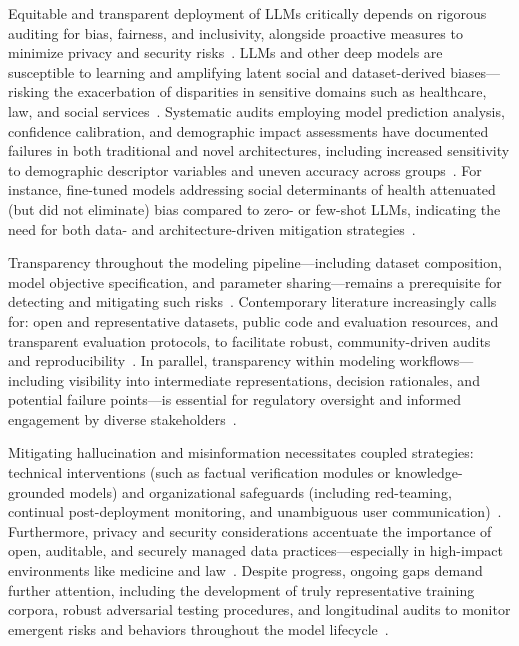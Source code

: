 \documentclass[sigconf]{acmart}
\begin{document}
Equitable and transparent deployment of LLMs critically depends on rigorous auditing for bias, fairness, and inclusivity, alongside proactive measures to minimize privacy and security risks~\cite{ref1, ref2, ref3, ref10, ref14, ref21, ref22, ref23, ref36, ref42, ref43, ref44, ref46, ref49, ref52, ref53, ref65, ref73}. LLMs and other deep models are susceptible to learning and amplifying latent social and dataset-derived biases—risking the exacerbation of disparities in sensitive domains such as healthcare, law, and social services~\cite{ref3, ref10, ref21, ref22, ref23, ref42, ref43, ref44, ref49, ref52, ref53, ref65}. Systematic audits employing model prediction analysis, confidence calibration, and demographic impact assessments have documented failures in both traditional and novel architectures, including increased sensitivity to demographic descriptor variables and uneven accuracy across groups~\cite{ref22, ref44, ref49, ref53}. For instance, fine-tuned models addressing social determinants of health attenuated (but did not eliminate) bias compared to zero- or few-shot LLMs, indicating the need for both data- and architecture-driven mitigation strategies~\cite{ref22, ref23}.

Transparency throughout the modeling pipeline—including dataset composition, model objective specification, and parameter sharing—remains a prerequisite for detecting and mitigating such risks~\cite{ref14, ref36, ref46, ref65, ref73}. Contemporary literature increasingly calls for: 
open and representative datasets,
public code and evaluation resources, and
transparent evaluation protocols,
to facilitate robust, community-driven audits and reproducibility~\cite{ref1, ref36, ref44, ref49, ref65, ref73}. In parallel, transparency within modeling workflows—including visibility into intermediate representations, decision rationales, and potential failure points—is essential for regulatory oversight and informed engagement by diverse stakeholders~\cite{ref14, ref45, ref46, ref49, ref52, ref65}.

Mitigating hallucination and misinformation necessitates coupled strategies: technical interventions (such as factual verification modules or knowledge-grounded models) and organizational safeguards (including red-teaming, continual post-deployment monitoring, and unambiguous user communication)~\cite{ref3, ref10, ref21, ref42, ref43, ref65}. Furthermore, privacy and security considerations accentuate the importance of open, auditable, and securely managed data practices—especially in high-impact environments like medicine and law~\cite{ref14, ref36, ref42, ref46, ref53, ref65}. Despite progress, ongoing gaps demand further attention, including the development of truly representative training corpora, robust adversarial testing procedures, and longitudinal audits to monitor emergent risks and behaviors throughout the model lifecycle~\cite{ref21, ref23, ref42, ref65, ref73}.
\end{document}
